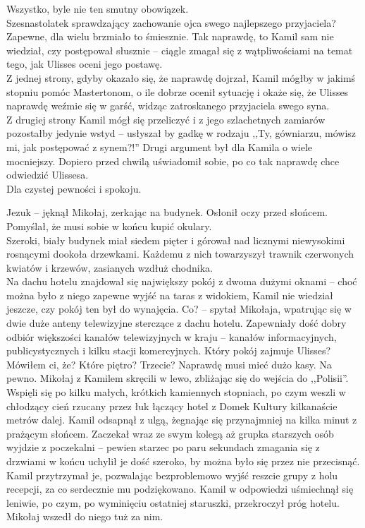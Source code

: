 \documentclass[../MAIN.tex]{subfiles}
\begin{document}
Wszystko, byle nie ten smutny obowiązek.\\
Szesnastolatek sprawdzający zachowanie ojca swego najlepszego przyjaciela? Zapewne, dla wielu brzmiało to śmiesznie. Tak naprawdę, to Kamil sam nie wiedział, czy postępował słusznie -- ciągle zmagał się z wątpliwościami na temat tego, jak Ulisses oceni jego postawę.\\
Z jednej strony, gdyby okazało się, że naprawdę dojrzał, Kamil mógłby w jakimś stopniu pomóc Mastertonom, o ile dobrze ocenił sytuację i okaże się, że Ulisses naprawdę weźmie się w garść, widząc zatroskanego przyjaciela swego syna.\\
Z drugiej strony Kamil mógł się przeliczyć i z jego szlachetnych zamiarów pozostałby jedynie wstyd -- usłyszał by gadkę w rodzaju ,,Ty, gówniarzu, mówisz mi, jak postępować z synem?!''
Drugi argument był dla Kamila o wiele mocniejszy. Dopiero przed chwilą uświadomił sobie, po co tak naprawdę chce odwiedzić Ulissesa.\\
Dla czystej pewności i spokoju.

\dd\sx Jezu\3k -- jęknął Mikołaj, zerkając na budynek. 
\qd
Osłonił oczy przed słońcem. Pomyślał, że musi sobie w końcu kupić okulary.\\
Szeroki, biały budynek miał siedem pięter i górował nad licznymi niewysokimi rosnącymi dookoła drzewkami. Każdemu z nich towarzyszył trawnik czerwonych kwiatów i krzewów, zasianych wzdłuż chodnika.\\
Na dachu hotelu znajdował się największy pokój z dwoma dużymi oknami -- choć można było z niego zapewne wyjść na taras z widokiem, Kamil nie wiedział jeszcze, czy pokój ten był do wynajęcia.
\sx Co? -- spytał Mikołaja, wpatrując się w dwie duże anteny telewizyjne sterczące z dachu hotelu. Zapewniały dość dobry odbiór większości kanałów telewizyjnych w kraju -- kanałów informacyjnych, publicystycznych i kilku stacji komercyjnych.
\xx Który pokój zajmuje Ulisses?
\xx Mówiłem ci, że?
\xx Które piętro?
\xx Trzecie?
\xx Naprawdę musi mieć dużo kasy.
\xx Na pewno.
\qd
Mikołaj z Kamilem skręcili w lewo, zbliżając się do wejścia do ,,Polisii''. Wspięli się po kilku małych, krótkich kamiennych stopniach, po czym weszli w chłodzący cień rzucany przez łuk łączący hotel z Domek Kultury kilkanaście metrów dalej. Kamil odsapnął z ulgą, żegnając się przynajmniej na kilka minut z prażącym słońcem. Zaczekał wraz ze swym kolegą aż grupka starszych osób wyjdzie z poczekalni -- pewien starzec po paru sekundach zmagania się z drzwiami w końcu uchylił je dość szeroko, by można było się przez nie przecisnąć.\\
Kamil przytrzymał je, pozwalając bezproblemowo wyjść reszcie grupy z holu recepcji, za co serdecznie mu podziękowano. Kamil w odpowiedzi uśmiechnął się leniwie, po czym, po wyminięciu ostatniej staruszki, przekroczył próg hotelu. Mikołaj wszedł do niego tuż za nim.
\end{document}
